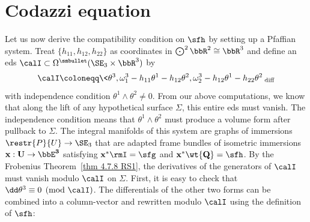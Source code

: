 \section{Codazzi equation}

Let us now derive the compatibility condition on $\sfh$ by setting up a Pfaffian system. Treat $\{h_{11},h_{12},h_{22}\}$ as coordinates in $\bigodot^2 \bbR^2\cong\bbR^3$ and define an \gls{eds} $\calI\subset \Omega^{\smbullet }(\SE_3\times \bbR^3)$ by
\[\calI\coloneqq \<\theta^3,\omega_1^3-h_{11}\theta^1-h_{12}\theta^2,\omega_2^3-h_{12}\theta^1-h_{22}\theta^2\>_{\mathrm{diff}}\]
with independence condition $\theta^1\wedge\theta^2\neq 0$.
From our above computations, we know that along the lift of any hypothetical surface $\Sigma$, this entire \gls{eds} must vanish. The independence condition means that $\theta^1\wedge\theta^2$ must produce a volume form after pullback to $\Sigma$. The integral manifolds of this system are graphs of immersions $\restr{P}{U}\to \SE_3$ that are adapted frame bundles of isometric immersions $\bf{x}:U\to \bbE^3$ satisfying $\bf{x}^\ast \rmI=\sfg$ and $\bf{x}^\ast \wt{Q}=\sfh$. By the Frobenius Theorem~\ref{thm 4.7.8 RS1}, the derivatives of the generators of $\calI$ must vanish modulo $\calI$ on $\Sigma$. First, it is easy to check that $\dd\theta^3\equiv 0 \pmod{\calI}$. The differentials of the other two forms can be combined into a column-vector and rewritten modulo $\calI$ using the definition of $\sfh$:
